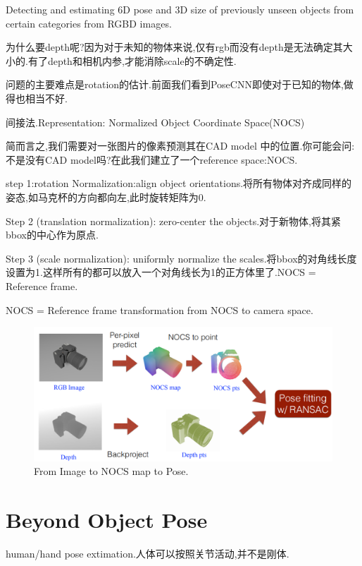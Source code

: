 Detecting and estimating 6D pose and 3D size of previously unseen objects from certain categories from RGBD images.

为什么要depth呢?因为对于未知的物体来说,仅有rgb而没有depth是无法确定其大小的.有了depth和相机内参,才能消除scale的不确定性.

问题的主要难点是rotation的估计.前面我们看到PoseCNN即使对于已知的物体,做得也相当不好.

间接法.Representation: Normalized Object Coordinate Space(NOCS)

简而言之,我们需要对一张图片的像素预测其在CAD model 中的位置.你可能会问:不是没有CAD model吗?在此我们建立了一个reference space:NOCS.

step 1:rotation Normalization:align object orientations.将所有物体对齐成同样的姿态,如马克杯的方向都向左,此时旋转矩阵为0.

Step 2 (translation normalization): zero-center the objects.对于新物体,将其紧bbox的中心作为原点.

Step 3 (scale normalization): uniformly normalize the scales.将bbox的对角线长度设置为1.这样所有的都可以放入一个对角线长为1的正方体里了.NOCS = Reference frame.

NOCS = Reference frame transformation from NOCS to camera space.

\begin{figure}[htbp]
   \centering
   \includegraphics[scale=0.65]{figures/image_nocs_pose.png}
   \caption{From Image to NOCS map to Pose.}
   \label{}
\end{figure}

\section{Beyond Object Pose}
human/hand pose extimation.人体可以按照关节活动,并不是刚体.

